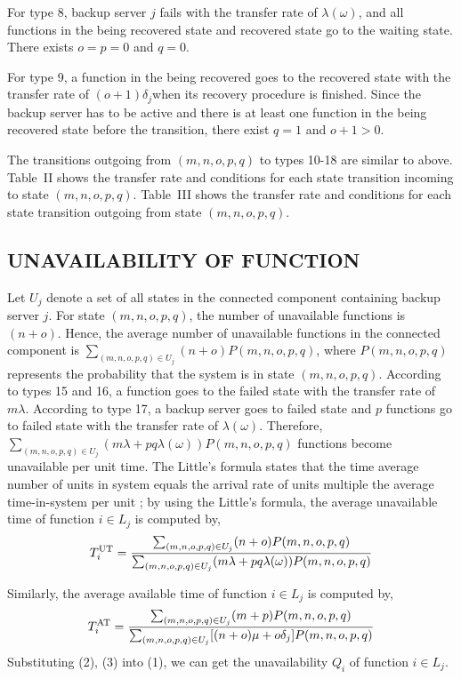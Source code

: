 \documentclass[conference]{IEEEtran}
\begin{document}
For type 8, backup server $j$ fails with the transfer rate of $\lambda(\omega)$, and all functions in the being recovered state and recovered state go to the waiting state. There exists $o=p=0$ and $q=0$.

For type 9, a function in the being recovered goes to the recovered state with the transfer rate of $(o+1)\delta_j$when its recovery procedure is finished. Since the backup server has to be active and there is at least one function in the being recovered state before the transition, there exist $q=1$ and $o+1>0$.

The transitions outgoing from $(m,n,o,p,q)$ to types 10-18 are similar to above.
Table~II shows the transfer rate and conditions for each state transition incoming to state $(m,n,o,p,q)$. Table~III shows the transfer rate and conditions for each state transition outgoing from state $(m,n,o,p,q)$. 






\subsection{UNAVAILABILITY OF FUNCTION}
Let $U_j$ denote a set of all states in the connected component containing backup server $j$. For state $(m,n,o,p,q)$, the number of unavailable functions is $(n+o)$. Hence, the average number of unavailable functions in the connected component is $\sum_{(m,n,o,p,q)\in U_j}(n+o)P(m,n,o,p,q)$, where $P(m,n,o,p,q)$ represents the probability that the system is in state $(m,n,o,p,q)$. According to types 15 and 16, a function goes to the failed state with the transfer rate of $m\lambda$. According to type 17, a backup server goes to failed state and $p$ functions go to failed state with the transfer rate of $\lambda(\omega)$. Therefore, $\sum_{(m,n,o,p,q)\in U_j}(m\lambda+pq\lambda(\omega))P(m,n,o,p,q)$ functions become unavailable per unit time. The Little's formula states that the time average number of units in system equals the arrival rate of units multiple the average time-in-system per unit \cite{little1961proof}; by using the Little's formula, the average unavailable time of function $i \in L_j$ is computed by,
\begin{equation}
T_i^{\rm UT}=\frac{\sum_{(m,n,o,p,q)\in U_j}(n+o)P(m,n,o,p,q)}{\sum_{(m,n,o,p,q)\in U_j}(m\lambda+pq\lambda(\omega))P(m,n,o,p,q)}
\end{equation}

Similarly, the average available time of function $i \in L_j$ is computed by,
\begin{equation}
T_i^{\rm AT}=\frac{\sum_{(m,n,o,p,q)\in U_j}(m+p)P(m,n,o,p,q)}{\sum_{(m,n,o,p,q)\in U_j}[(n+o)\mu+o\delta_j]P(m,n,o,p,q)}
\end{equation}
Substituting (2), (3) into (1), we can get the unavailability $Q_i$ of function $i \in L_j$.
\end{document}
